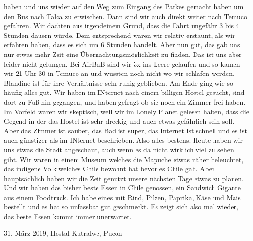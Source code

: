 \documentclass[11pt]{book}
\begin{document}
haben und uns wieder auf den Weg zum Eingang des Parkes gemacht haben um den Bus nach Talca zu erwischen. Dann sind wir auch direkt 
weiter nach Temuco gefahren. Wir dachten aus irgendeinem Grund, dass die Fahrt ungefähr 3 bis 4 Stunden dauern würde. Dem entsprechend 
waren wir relativ erstaunt, als wir erfahren haben, dass es sich um 6 Stunden handelt. Aber nun gut, das gab uns nur etwas mehr Zeit 
eine Übernachtungsmöglichkeit zu finden. Das ist uns aber leider nicht gelungen. Bei AirBnB sind wir 3x ins Leere gelaufen und so 
kamen wir 21 Uhr 30 in Temuco an und wussten noch nicht wo wir schlafen werden. Blandine ist für ihre Verhältnisse sehr ruhig geblieben. 
Am Ende ging wie so häufig alles gut. Wir haben im INternet nach einem billigen Hostel gesucht, sind dort zu Fuß hin gegangen, und haben 
gefragt ob sie noch ein Zimmer frei haben. Im Vorfeld waren wir skeptisch, weil wir im Lonely Planet gelesen haben, dass die Gegend 
in der das Hostel ist sehr dreckig und auch etwas gefährlich sein soll. Aber das Zimmer ist sauber, das Bad ist super, das Internet 
ist schnell und es ist auch günstiger als im INternet beschrieben. Also alles bestens. Heute haben wir uns etwas die Stadt angeschaut, 
auch wenn es da nicht wirklich viel zu sehen gibt. Wir waren in einem Museum welches die Mapuche etwas näher beleuchtet, das indigene Volk 
welches Chile bewohnt hat bevor es Chile gab. Aber hauptsächlich haben wir die Zeit genutzt unsere nächsten Tage etwas zu planen. Und 
wir haben das bisher beste Essen in Chile genossen, ein Sandwich Gigante aus einem Foodtruck. Ich habe eines mit Rind, Pilzen, 
Paprika, Käse und Mais bestellt und es hat so unfassbar gut geschmeckt. Es zeigt sich also mal wieder, das beste Essen kommt 
immer unerwartet.


31. März 2019, Hostal Kutralwe, Pucon
\end{document}
